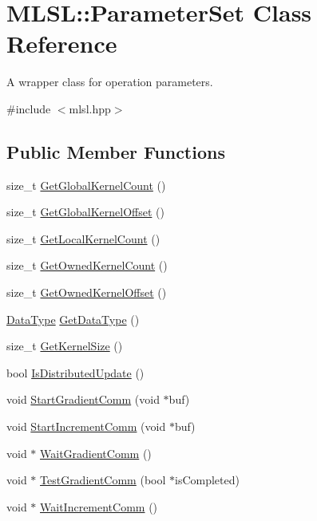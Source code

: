 \hypertarget{classMLSL_1_1ParameterSet}{\section{M\-L\-S\-L\-:\-:Parameter\-Set Class Reference}
\label{classMLSL_1_1ParameterSet}
}


A wrapper class for operation parameters.  




{\ttfamily \#include $<$mlsl.\-hpp$>$}

\subsection*{Public Member Functions}
\begin{DoxyCompactItemize}
\item 
size\-\_\-t \hyperlink{classMLSL_1_1ParameterSet_aba87f78ad51b89e2821ec9d4c709e2c6}{Get\-Global\-Kernel\-Count} ()
\item 
size\-\_\-t \hyperlink{classMLSL_1_1ParameterSet_af9a05d84923d2cc23d84e82dc60f6dbd}{Get\-Global\-Kernel\-Offset} ()
\item 
size\-\_\-t \hyperlink{classMLSL_1_1ParameterSet_ab0c4422047412818aec77d6920fc8949}{Get\-Local\-Kernel\-Count} ()
\item 
size\-\_\-t \hyperlink{classMLSL_1_1ParameterSet_a1db8d919538c69ab50d66f2b07c39853}{Get\-Owned\-Kernel\-Count} ()
\item 
size\-\_\-t \hyperlink{classMLSL_1_1ParameterSet_a833ad4bd71f441c2b65ad863ee869165}{Get\-Owned\-Kernel\-Offset} ()
\item 
\hyperlink{namespaceMLSL_a09825f36959e78645dd9bc70bdf840ba}{Data\-Type} \hyperlink{classMLSL_1_1ParameterSet_af6e4237232b9eae4e74fc0e8bfeace47}{Get\-Data\-Type} ()
\item 
size\-\_\-t \hyperlink{classMLSL_1_1ParameterSet_a98b4e7d8d9dc174223d1fb07723d964e}{Get\-Kernel\-Size} ()
\item 
bool \hyperlink{classMLSL_1_1ParameterSet_a848c20b29fb599d682c84ce07525ce1b}{Is\-Distributed\-Update} ()
\item 
void \hyperlink{classMLSL_1_1ParameterSet_a5a29f0be1a2ecac5f11672cd81df79f8}{Start\-Gradient\-Comm} (void $\ast$buf)
\item 
void \hyperlink{classMLSL_1_1ParameterSet_a7988f04a1de14e9ab2375ed97efca1c0}{Start\-Increment\-Comm} (void $\ast$buf)
\item 
void $\ast$ \hyperlink{classMLSL_1_1ParameterSet_a870d16e0b4aa32af415edbc30f34e519}{Wait\-Gradient\-Comm} ()
\item 
void $\ast$ \hyperlink{classMLSL_1_1ParameterSet_a31f20a95505e161573b84db11120c36b}{Test\-Gradient\-Comm} (bool $\ast$is\-Completed)
\item 
void $\ast$ \hyperlink{classMLSL_1_1ParameterSet_a8376f1d8fbf2c6675659df822269fbfc}{Wait\-Increment\-Comm} ()
\end{DoxyCompactItemize}


